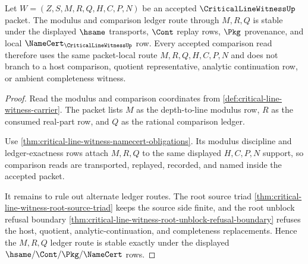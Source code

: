 \begin{theorem}
\label{thm:critical-line-witness-ledger-route-stability}
Let $W=(Z,S,M,R,Q,H,C,P,N)$ be an accepted $\CriticalLineWitnessUp$ packet.
The modulus and comparison ledger route through $M,R,Q$ is stable under the
displayed $\hsame$ transports, $\Cont$ replay rows, $\Pkg$ provenance, and
local $\NameCert_{\CriticalLineWitnessUp}$ row. Every accepted comparison read
therefore uses the same packet-local route $M,R,Q,H,C,P,N$ and does not branch
to a host comparison, quotient representative, analytic continuation row, or
ambient completeness witness.
\end{theorem}
\begin{proof}
Read the modulus and comparison coordinates from
\autoref{def:critical-line-witness-carrier}. The packet lists $M$ as the
depth-to-line modulus row, $R$ as the consumed real-part row, and $Q$ as the
rational comparison ledger.

Use \autoref{thm:critical-line-witness-namecert-obligations}. Its modulus
discipline and ledger-exactness rows attach $M,R,Q$ to the same displayed
$H,C,P,N$ support, so comparison reads are transported, replayed, recorded,
and named inside the accepted packet.

It remains to rule out alternate ledger routes. The root source triad
\autoref{thm:critical-line-witness-root-source-triad} keeps the source side
finite, and the root unblock refusal boundary
\autoref{thm:critical-line-witness-root-unblock-refusal-boundary} refuses the
host, quotient, analytic-continuation, and completeness replacements. Hence
the $M,R,Q$ ledger route is stable exactly under the displayed
$\hsame/\Cont/\Pkg/\NameCert$ rows.
\end{proof}

